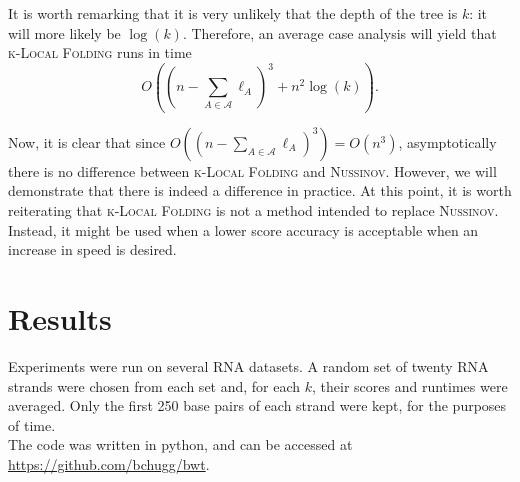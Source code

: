 \documentclass[11pt]{article}
\newcommand{\klf}{\textsc{k-Local Folding}\xspace}
\newcommand{\rf}{\textsc{Nussinov}\xspace}
\newcommand{\al}{\mathscr{A}}
\begin{document}
It is worth remarking that it is very unlikely that the depth of the tree is $k$: it will more likely be $\log(k)$. Therefore, an average case analysis will yield that \klf runs in time 
\[O\left(\left(n-\sum_{A\in\al}\ell_A\right)^3+n^2\log (k)\right).\]

Now, it is clear that since $O((n-\sum_{A\in\al}\ell_A)^3)=O(n^3)$, asymptotically there is no difference between \klf and \rf. However, we will demonstrate that there is indeed a difference in practice. At this point, it is worth reiterating that \klf is not a method intended to replace \rf. Instead, it might be used when a lower score accuracy is acceptable when an increase in speed is desired. 

\section{Results}
Experiments were run on several RNA datasets. A random set of twenty RNA strands were chosen from each set and, for each $k$, their scores and runtimes were averaged. Only the first 250 base pairs of each strand were kept, for the purposes of time. \\

The code was written in python, and can be accessed at \url{https://github.com/bchugg/bwt}.
\end{document}
